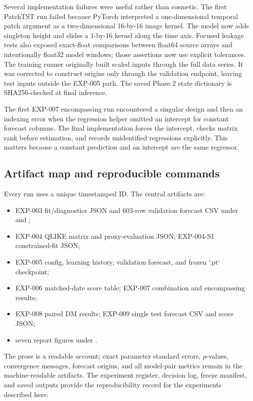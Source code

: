 \documentclass[11pt,a4paper]{article}
\begin{document}
Several implementation failures were useful rather than cosmetic. The first PatchTST run failed
because PyTorch interpreted a one-dimensional temporal patch argument as a two-dimensional
16-by-16 image kernel. The model now adds singleton height and slides a 1-by-16 kernel along the
time axis. Focused leakage tests also exposed exact-float comparisons between float64 source
arrays and intentionally float32 model windows; those assertions now use explicit tolerances.
The training runner originally built scaled inputs through the full data series. It was corrected
to construct origins only through the validation endpoint, leaving test inputs outside the
EXP-005 path. The saved Phase 2 state dictionary is SHA256-checked at final inference.

The first EXP-007 encompassing run encountered a singular design and then an indexing error when
the regression helper omitted an intercept for constant forecast columns. The final implementation
forces the intercept, checks matrix rank before estimation, and records unidentified regressions
explicitly. This matters because a constant prediction and an intercept are the same regressor.

\subsection{Artifact map and reproducible commands}
Every run uses a unique timestamped ID. The central artifacts are:
\begin{itemize}
\item EXP-003 fit/diagnostics JSON and 603-row validation forecast CSV under
   and ;
\item EXP-004 QLIKE matrix and proxy-evaluation JSON; EXP-004-S1 constrained-fit JSON;
\item EXP-005 config, learning history, validation forecast, and frozen `.pt` checkpoint;
\item EXP-006 matched-date score table; EXP-007 combination and encompassing results;
\item EXP-008 paired DM results; EXP-009 single test forecast CSV and score JSON;
\item seven report figures under .
\end{itemize}
The prose is a readable account; exact parameter standard errors, $p$-values, convergence
messages, forecast origins, and all model-pair metrics remain in the machine-readable artifacts.
The experiment register, decision log, freeze manifest, and saved outputs provide the
reproducibility record for the experiments described here.
\end{document}
